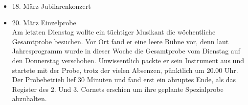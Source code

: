 \begin{history}
\begin{itemize}
            \item  18. März Jubilarenkonzert

            \item 20. März Einzelprobe\\
                  Am letzten Dienstag wollte ein tüchtiger Musikant die wöchentliche
                  Gesamtprobe besuchen. Vor Ort fand er eine leere Bühne vor, denn
                  laut Jahresprogramm wurde in dieser Woche die Gesamtprobe vom
                  Dienstag auf den Donnerstag verschoben. Unwissentlich packte er
                  sein Instrument aus und startete mit der Probe, trotz der vielen
                  Absenzen, pünktlich um 20.00 Uhr. Der Probebetrieb lief 30 Minuten
                  und fand erst ein abruptes Ende, als das Register des 2. Und 3.
                  Cornets erschien um ihre geplante Spezialprobe abzuhalten.

      \end{itemize}

\end{history}
